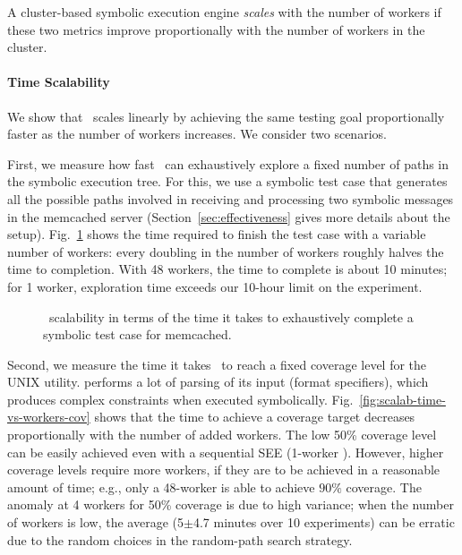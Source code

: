 A cluster-based symbolic execution engine \emph{scales} with the number of workers if these two metrics improve proportionally with the number of workers in the cluster.

\paragraph{Time Scalability} We show that \cnine\ scales linearly by achieving the same testing goal proportionally faster as the number of workers increases. We consider two scenarios.

First, we measure how fast \cnine\ can exhaustively explore a fixed number of paths in the symbolic execution tree.  For this, we use a symbolic test case that generates all the possible paths involved in receiving and processing two symbolic messages in the memcached server (Section~\ref{sec:effectiveness} gives more details about the setup). Fig.~\ref{fig:scalab-time-vs-workers} shows the time required to finish the test case with a variable number of workers: every doubling in the number of workers roughly halves the time to completion.  With 48 workers, the time to complete is about 10 minutes; for 1 worker,  exploration time exceeds our 10-hour limit on the experiment.  


\begin{figure}[h!]
  \centering
  \caption{\cnine\ scalability in terms of the time it takes to exhaustively complete a symbolic test case for memcached.}
  \label{fig:scalab-time-vs-workers}
\end{figure}

Second, we measure the time it takes \cnine\ to reach a fixed coverage level for the  UNIX utility.   performs a lot of parsing of its input (format specifiers), which produces complex constraints when executed symbolically.   Fig.~\ref{fig:scalab-time-vs-workers-cov} shows that the time to achieve a coverage target decreases proportionally with the number of added workers.  The low 50\% coverage level can be easily achieved even with a sequential SEE (1-worker \cnine). However, higher coverage levels require more workers, if they are to be achieved in a reasonable amount of time; e.g., only a 48-worker \cnine is able to achieve  $90\%$ coverage.  The anomaly at 4 workers for 50\% coverage is due to high variance; when the number of workers is low, the average (5$\pm$4.7 minutes over 10 experiments) can be erratic due to the random choices in the random-path search strategy.

